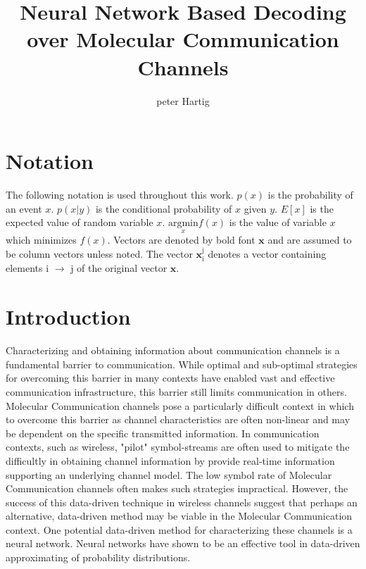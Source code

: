 \documentclass[12pt,a4paper]{report}
\title{Neural Network Based Decoding over Molecular Communication Channels}
\author{peter Hartig}
\begin{document}
\maketitle

\begin{abstract}

\end{abstract}

\newpage
\tableofcontents
\newpage
\section{Notation}
The following notation is used throughout this work.
$p(x)$ is the probability of an event $x$.
$p(x|y)$ is the conditional probability of $x$ given $y$.
$E[x]$ is the expected value of random variable $x$.
$\underset{x}{\text{argmin}} f(x)$ is the value of variable $x$ which minimizes $f(x)$.
Vectors  are denoted by bold font $\mathbf{x}$ and are assumed to be column vectors unless noted.
The vector $\mathbf{x}_{\mathrm{i}}^{\mathrm{j}}$ denotes a vector containing elements i $\rightarrow$ j of the original vector $\mathbf{x}$.

\section{Introduction}
Characterizing and obtaining information about communication channels is a fundamental barrier to communication. While optimal and sub-optimal strategies for overcoming this barrier in many contexts have enabled vast and effective communication infrastructure, this barrier still limits communication in others. Molecular Communication channels pose a particularly difficult context in which to overcome this barrier as channel characteristics are often non-linear and may be dependent on the specific transmitted information.
In communication contexts, such as wireless, "pilot" symbol-streams are often used to mitigate the difficultly in obtaining channel information by provide real-time information supporting an underlying channel model. The low symbol rate of Molecular Communication channels often makes such strategies impractical. However, the success of this data-driven technique in wireless channels suggest that perhaps an alternative, data-driven method may be viable in the Molecular Communication context. One potential data-driven method for characterizing these channels is a neural network. Neural networks have shown to be an effective tool in data-driven approximating of probability distributions.
\par
\end{document}
